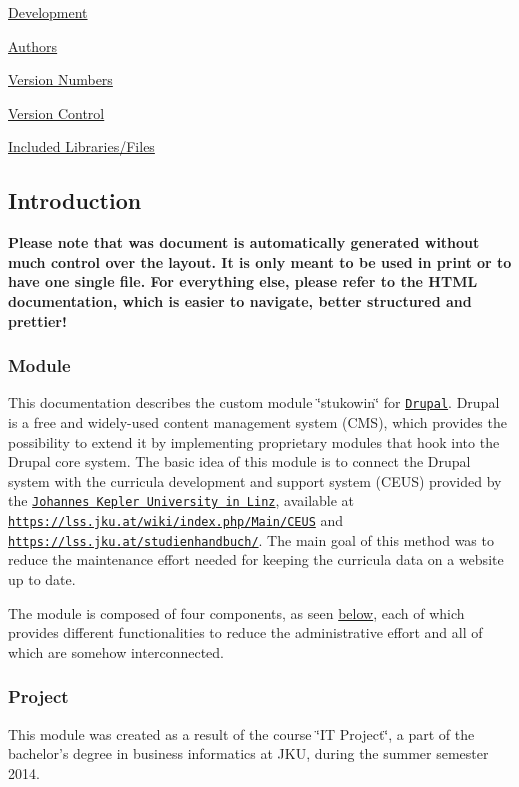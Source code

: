 \begin{DoxyEnumerate}
\begin{DoxyEnumerate}
\end{DoxyEnumerate}
\item \hyperlink{index_Development}{Development}
\begin{DoxyEnumerate}
\item \hyperlink{index_Authors}{Authors}
\item \hyperlink{index_versionnumbers}{Version Numbers}
\item \hyperlink{index_versioncontrol}{Version Control}
\end{DoxyEnumerate}
\item \hyperlink{index_Included}{Included Libraries/\+Files}
\end{DoxyEnumerate}\hypertarget{index_Introduction}{}\subsection{Introduction}\label{index_Introduction}
 \textrm{\textbf{Please note that was document is automatically generated without much control over the layout. It is only meant to be used in print or to have one single file. For everything else, please refer to the HTML documentation, which is easier to navigate, better structured and prettier!}}  \hypertarget{index_Module_Intro}{}\subsubsection{Module}\label{index_Module_Intro}
This documentation describes the custom module \char`\"{}stukowin\char`\"{} for \href{http://drupal.org/}{\tt Drupal}. Drupal is a free and widely-\/used content management system (C\+M\+S), which provides the possibility to extend it by implementing proprietary modules that hook into the Drupal core system. The basic idea of this module is to connect the Drupal system with the curricula development and support system (C\+E\+U\+S) provided by the \href{http://jku.at}{\tt Johannes Kepler University in Linz}, available at \href{https://lss.jku.at/wiki/index.php/Main/CEUS}{\tt https\+://lss.\+jku.\+at/wiki/index.\+php/\+Main/\+C\+E\+U\+S} and \href{https://lss.jku.at/studienhandbuch/}{\tt https\+://lss.\+jku.\+at/studienhandbuch/}. The main goal of this method was to reduce the maintenance effort needed for keeping the curricula data on a website up to date.

The module is composed of four components, as seen \hyperlink{index_Modules}{below}, each of which provides different functionalities to reduce the administrative effort and all of which are somehow interconnected.\hypertarget{index_Project_Intro}{}\subsubsection{Project}\label{index_Project_Intro}
This module was created as a result of the course \char`\"{}\+I\+T Project\char`\"{}, a part of the bachelor's degree in business informatics at J\+K\+U, during the summer semester 2014.

